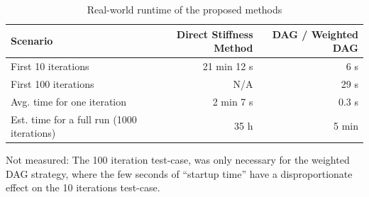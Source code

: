 \begin{table}[htbp]
  \centering
  \caption{Real-world runtime of the proposed methods}
  \label{tab:stiff_real_world_runtimes_cmp}
  \begin{threeparttable}
    \begin{tabular}{lrr}
      \toprule
      Scenario & Direct Stiffness Method & DAG / Weighted DAG \\
      \midrule
      First 10 iterations                        & 21 min 12 s & 6 s   \\
      First 100 iterations                       & N/A\tnote{*} & 29 s \\
      Avg. time for one iteration                & 2 min 7 s   & 0.3 s \\
      Est. time for a full run (1000 iterations) & 35 h        & 5 min \\
      \bottomrule
    \end{tabular}
    \begin{tablenotes}
      \footnotesize
      \item[*] Not measured: The 100 iteration test-case, was only necessary for the 
      weighted DAG strategy, where the few seconds of ``startup time'' have a disproportionate
      effect on the 10 iterations test-case.
    \end{tablenotes}
  \end{threeparttable}
\end{table}

